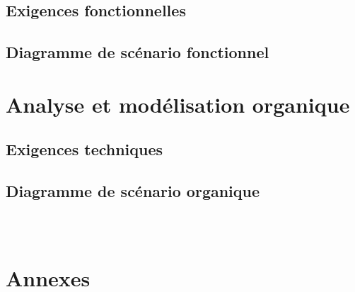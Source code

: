 \documentclass{article}
\begin{document}
\subsection{Exigences fonctionnelles}

\clearpage


\subsection{Diagramme de scénario fonctionnel}

\clearpage


\subsection{}

\clearpage


\section{Analyse et modélisation organique}



\subsection{Exigences techniques}

\clearpage


\subsection{Diagramme de scénario organique}

\clearpage


\subsection{}

\clearpage


\

\section{Annexes}
\end{document}

